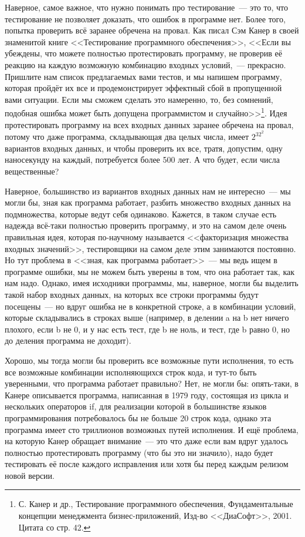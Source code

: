 \documentclass{../../text-style}
\begin{document}
Наверное, самое важное, что нужно понимать про тестирование~--- это то, что тестирование не позволяет доказать, что ошибок в программе нет. Более того, попытка проверить всё заранее обречена на провал. Как писал Сэм Канер в своей знаменитой книге <<Тестирование программного обеспечения>>, <<Если вы убеждены, что можете полностью протестировать программу, не проверив её реакцию на каждую возможную комбинацию входных условий,~--- прекрасно. Пришлите нам список предлагаемых вами тестов, и мы напишем программу, которая пройдёт их все и продемонстрирует эффектный сбой в пропущенной вами ситуации. Если мы сможем сделать это намеренно, то, без сомнений, подобная ошибка может быть допущена программистом и случайно>>\footnote{С. Канер и др., Тестирование программного обеспечения, Фундаментальные концепции менеджмента бизнес-приложений, Изд-во <<ДиаСофт>>, 2001. Цитата со стр. 42.}. Идея протестировать программу на всех входных данных заранее обречена на провал, потому что даже программа, складывающая два целых числа, имеет $2^{32^2}$ вариантов входных данных, и чтобы проверить их все, тратя, допустим, одну наносекунду на каждый, потребуется более 500 лет. А что будет, если числа вещественные?

Наверное, большинство из вариантов входных данных нам не интересно~--- мы могли бы, зная как программа работает, разбить множество входных данных на подмножества, которые ведут себя одинаково. Кажется, в таком случае есть надежда всё-таки полностью проверить программу, и это на самом деле очень правильная идея, которая по-научному называется <<факторизация множества входных значений>>, тестировщики на самом деле этим занимаются постоянно. Но тут проблема в <<зная, как программа работает>>~--- мы ведь ищем в программе ошибки, мы не можем быть уверены в том, что она работает так, как нам надо. Однако, имея исходники программы, мы, наверное, могли бы выделить такой набор входных данных, на которых все строки программы будут посещены~--- но вдруг ошибка не в конкретной строке, а в комбинации условий, которые складывались в строках выше (например, в делении a на b нет ничего плохого, если b не 0, и у нас есть тест, где b не ноль, и тест, где b равно 0, но до деления программа не доходит).

Хорошо, мы тогда могли бы проверить все возможные пути исполнения, то есть все возможные комбинации исполняющихся строк кода, и тут-то быть уверенными, что программа работает правильно? Нет, не могли бы: опять-таки, в Канере описывается программа, написанная в 1979 году, состоящая из цикла и нескольких операторов if, для реализации которой в большинстве языков программирования потребовалось бы не больше 20 строк кода, однако эта программа имеет сто триллионов возможных путей исполнения. И ещё проблема, на которую Канер обращает внимание~--- это что даже если вам вдруг удалось полностью протестировать программу (что бы это ни значило), надо будет тестировать её после каждого исправления или хотя бы перед каждым релизом новой версии.
\end{document}
